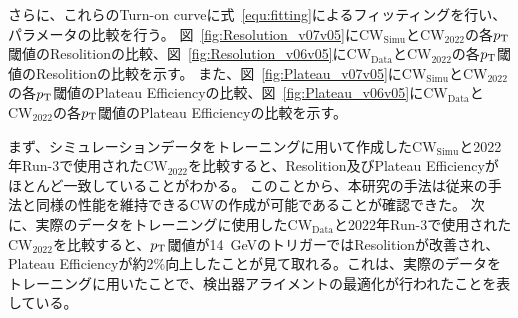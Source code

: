 さらに、これらのTurn-on curveに式~\eqref{equ:fitting}によるフィッティングを行い、パラメータの比較を行う。
図~\ref{fig:Resolution_v07v05}に$\mathrm{CW_{Simu}}$と$\mathrm{CW_{2022}}$の各$p_{\rm{T}}$閾値のResolitionの比較、図~\ref{fig:Resolution_v06v05}に$\mathrm{CW_{Data}}$と$\mathrm{CW_{2022}}$の各$p_{\rm{T}}$閾値のResolitionの比較を示す。
また、図~\ref{fig:Plateau_v07v05}に$\mathrm{CW_{Simu}}$と$\mathrm{CW_{2022}}$の各$p_{\rm{T}}$閾値のPlateau Efficiencyの比較、図~\ref{fig:Plateau_v06v05}に$\mathrm{CW_{Data}}$と$\mathrm{CW_{2022}}$の各$p_{\rm{T}}$閾値のPlateau Efficiencyの比較を示す。

まず、シミュレーションデータをトレーニングに用いて作成した$\mathrm{CW_{Simu}}$と2022年Run-3で使用された$\mathrm{CW_{2022}}$を比較すると、Resolition及びPlateau Efficiencyがほとんど一致していることがわかる。
このことから、本研究の手法は従来の手法と同様の性能を維持できるCWの作成が可能であることが確認できた。
次に、実際のデータをトレーニングに使用した$\mathrm{CW_{Data}}$と2022年Run-3で使用された$\mathrm{CW_{2022}}$を比較すると、$p_{\rm{T}}$閾値が14~GeVのトリガーではResolitionが改善され、Plateau Efficiencyが約2$\%$向上したことが見て取れる。これは、実際のデータをトレーニングに用いたことで、検出器アライメントの最適化が行われたことを表している。


